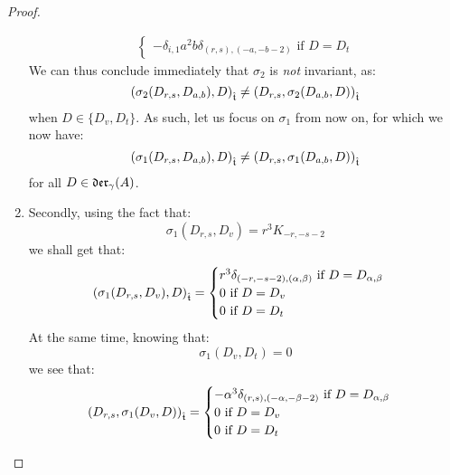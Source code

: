 \begin{proof}
\begin{enumerate}
$$\begin{aligned}
\begin{cases}
                                    \text{$-\delta_{i, 1} a^2 b \delta_{(r, s), (-a, -b - 2)}$ if $D = D_t$}
                                \end{cases}
                            \end{aligned}
                        $$
                    We can thus conclude immediately that $\sigma_2$ is \textit{not} invariant, as:
                        $$\left( \sigma_2(D_{r, s}, D_{a, b}), D \right)_{\extendedtoroidal} \not = \left( D_{r, s}, \sigma_2(D_{a, b}, D) \right)_{\extendedtoroidal}$$
                    when $D \in \{D_v, D_t\}$. As such, let us focus on $\sigma_1$ from now on, for which we now have:
                        $$\left( \sigma_1(D_{r, s}, D_{a, b}), D \right)_{\extendedtoroidal} \not = \left( D_{r, s}, \sigma_1(D_{a, b}, D) \right)_{\extendedtoroidal}$$
                    for all $D \in \divzero$.
                    \item Secondly, using the fact that:
                        $$\sigma_1(D_{r, s}, D_v) = r^3 K_{-r, -s - 2}$$
                    we shall get that:
                        $$
                            \left( \sigma_1(D_{r, s}, D_v), D \right)_{\extendedtoroidal} =
                            \begin{cases}
                                \text{$r^3 \delta_{(-r, -s - 2), (\alpha, \beta)}$ if $D = D_{\alpha, \beta}$}
                                \\
                                \text{$0$ if $D = D_v$}
                                \\
                                \text{$0$ if $D = D_t$}
                            \end{cases}
                        $$
                    At the same time, knowing that:
                        $$\sigma_1(D_v, D_t) = 0$$
                    we see that:
                        $$
                            \begin{aligned}
                                \left( D_{r, s}, \sigma_1(D_v, D) \right)_{\extendedtoroidal} =
                                \begin{cases}
                                    \text{$-\alpha^3 \delta_{(r, s), (-\alpha, -\beta - 2)}$ if $D = D_{\alpha, \beta}$}
                                    \\
                                    \text{$0$ if $D = D_v$}
                                    \\
                                    \text{$0$ if $D = D_t$}

\end{cases}
\end{aligned}$$
\end{enumerate}
\end{proof}

